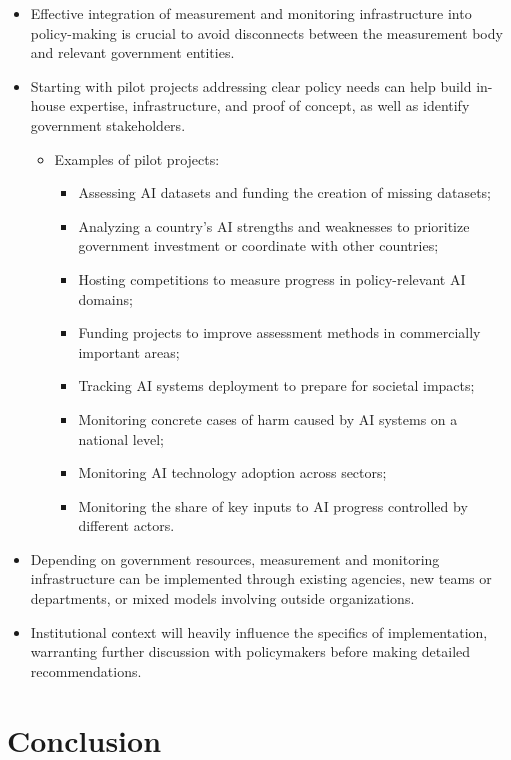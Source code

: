 \documentclass{article}
\begin{document}
\begin{multicols}{2}
\begin{itemize}
\item Effective integration of measurement and monitoring infrastructure into policy-making is crucial to avoid disconnects between the measurement body and relevant government entities.
\item Starting with pilot projects addressing clear policy needs can help build in-house expertise, infrastructure, and proof of concept, as well as identify government stakeholders.
    \begin{itemize}
        \item Examples of pilot projects:
            \begin{itemize}
                \item Assessing AI datasets and funding the creation of missing datasets;
                \item Analyzing a country's AI strengths and weaknesses to prioritize government investment or coordinate with other countries;
                \item Hosting competitions to measure progress in policy-relevant AI domains;
                \item Funding projects to improve assessment methods in commercially important areas;
                \item Tracking AI systems deployment to prepare for societal impacts;
                \item Monitoring concrete cases of harm caused by AI systems on a national level;
                \item Monitoring AI technology adoption across sectors;
                \item Monitoring the share of key inputs to AI progress controlled by different actors.
            \end{itemize}
    \end{itemize}
\item Depending on government resources, measurement and monitoring infrastructure can be implemented through existing agencies, new teams or departments, or mixed models involving outside organizations.
\item Institutional context will heavily influence the specifics of implementation, warranting further discussion with policymakers before making detailed recommendations.
\end{itemize}

\section*{Conclusion}


\end{multicols}
\end{document}
